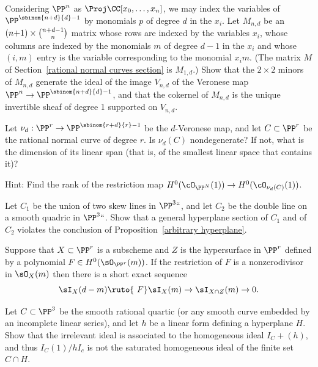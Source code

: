 \begin{exercise}\label{equations of Veroneses}
Considering $\PP^n$ as $\Proj \CC[x_0,\dots,x_n]$, we may index the
variables 
of $\PP^{\sbinom{n+d}{d}-1}$ by  monomials $p$
of degree $d$ in the $x_i$. Let $M_{n,d}$ be an $(n{+}1)\times \tbinom{n+d-1}{n}$ matrix 
whose rows are indexed by the variables $x_i$, whose columns are indexed by the monomials $m$ of degree $d-1$ in the $x_i$ and
whose $(i,m)$ entry is the variable corresponding to the monomial $x_im$. (The matrix
$M$ of Section~\ref{rational normal curves section} is $M_{1,d}$.) 
Show that the $2\times 2$ minors of $M_{n,d}$ generate the ideal of the image $V_{n,d}$ of the Veronese map 
$\PP^n\to \PP^{\sbinom{n+d}{d}-1}$, and that the cokernel of $M_{n,d}$ is the unique invertible sheaf of degree 1 supported on $V_{n,d}$.
\end{exercise}

\begin{exercise}
 Let $\nu_d: \PP^r \to \PP^{\sbinom{r+d}{r}-1}$ be the $d$-Veronese
 map, and let $C\subset \PP^r$ be the 
rational normal curve
%
of degree $r$. Is $\nu_d(C)$ nondegenerate? If not, what is the dimension of its linear span (that is, of the smallest linear
 space that contains it)?
 
 Hint: Find the rank of the restriction map $H^0(\cO_{\PP^N}(1)) \to H^0(\cO_{\nu_d(C)}(1))$.
\end{exercise}

\begin{exercise}\label{arbitrary hyperplane examples}
Let $C_1$ be the union of two 
\vadjust{\allowbreak}%
skew lines
%
in $\PP^3` `$, and let $C_2$ be the 
double line
%
on a smooth quadric in $\PP^3` `$.
Show that a general hyperplane section of $C_1$ and of $C_2$  violates the conclusion of Proposition~\ref{arbitrary hyperplane}.
\end{exercise}

\begin{exercise}\label{restriction of ideals}
Suppose that $X\subset \PP^r$ is a subscheme and  $Z$ is the hypersurface in $\PP^r$ defined by a polynomial $F\in H^0(\sO_{\PP^r}(m))$. If the restriction of $F$ is a nonzerodivisor in 
$\sO_X(m)$  then there is a short exact sequence
$$
\sI_X(d-m) \ruto {\ F} \sI_X(m) \to \sI_{X\cap Z}(m) \to 0.
$$
\end{exercise}

\begin{exercise}\label{bad restriction}
Let $C\subset \PP^3$ be the smooth rational quartic 
%
(or any smooth curve embedded by an incomplete linear series), and let
$h$ be a linear form defining a hyperplane $H$.
Show that
the  irrelevant ideal is associated to the 
homogeneous ideal $I_C+(h)$, and thus $I_C(1)/hI_c$ is not the saturated homogeneous ideal of the finite
set $C\cap H$. 
\end{exercise}

